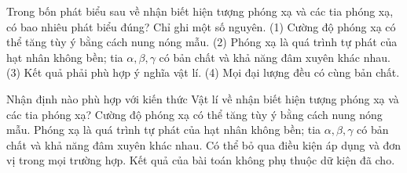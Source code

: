 \begin{ex}
Trong bốn phát biểu sau về nhận biết hiện tượng phóng xạ và các tia phóng xạ, có bao nhiêu phát biểu đúng? Chỉ ghi một số nguyên. (1) Cường độ phóng xạ có thể tăng tùy ý bằng cách nung nóng mẫu. (2) Phóng xạ là quá trình tự phát của hạt nhân không bền; tia $\alpha,\beta,\gamma$ có bản chất và khả năng đâm xuyên khác nhau. (3) Kết quả phải phù hợp ý nghĩa vật lí. (4) Mọi đại lượng đều có cùng bản chất.
\end{ex}

\begin{ex}
Nhận định nào phù hợp với kiến thức Vật lí về nhận biết hiện tượng phóng xạ và các tia phóng xạ?
\choice
{Cường độ phóng xạ có thể tăng tùy ý bằng cách nung nóng mẫu.}
{\True Phóng xạ là quá trình tự phát của hạt nhân không bền; tia $\alpha,\beta,\gamma$ có bản chất và khả năng đâm xuyên khác nhau.}
{Có thể bỏ qua điều kiện áp dụng và đơn vị trong mọi trường hợp.}
{Kết quả của bài toán không phụ thuộc dữ kiện đã cho.}
\end{ex}

